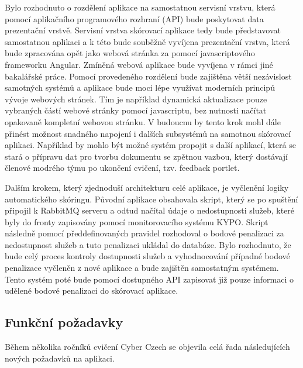 \documentclass[
  digital, %
  twoside, %
  table,   %
  lof,     %
  lot,     %
]{fithesis3}
\begin{document}
Bylo rozhodnuto o rozdělení aplikace na samostatnou servisní vrstvu, která pomocí aplikačního programového rozhraní (API) bude poskytovat data prezentační vrstvě. Servisní vrstva skórovací aplikace tedy bude představovat samostatnou aplikaci a k této bude souběžně vyvíjena prezentační vrstva, která bude zpracována opět jako webová stránka za pomocí javascriptového frameworku Angular. Zmíněná webová aplikace bude vyvíjena v rámci jiné bakalářské práce. Pomocí provedeného rozdělení bude zajištěna větší nezávislost samotných systémů a aplikace bude moci lépe využívat moderních principů vývoje webových stránek. Tím je například dynamická aktualizace pouze vybraných částí webové stránky pomocí javascriptu, bez nutnosti načítat opakovaně kompletní webovou stránku. V budoucnu by tento krok mohl dále přinést možnost  snadného napojení i dalších subsystémů na samotnou skórovací aplikaci. Například by mohlo být možné systém propojit s další aplikací, která se stará o přípravu dat pro tvorbu dokumentu se zpětnou vazbou, který dostávají členové modrého týmu po ukončení cvičení, tzv. feedback portlet.

Dalším krokem, který zjednoduší architekturu celé aplikace, je vyčlenění logiky automatického skóringu. Původní aplikace obsahovala skript, který se po spuštění připojil k RabbitMQ serveru a odtud načítal údaje o nedostupnosti služeb, které byly do fronty zapisovány pomocí monitorovacího systému KYPO. Skript následně pomocí předdefinovaných pravidel rozhodoval o bodové penalizaci za nedostupnost služeb a tuto penalizaci ukládal do databáze. Bylo rozhodnuto, že bude celý proces kontroly dostupnosti služeb a vyhodnocování případné bodové penalizace vyčleněn z nové aplikace a bude zajištěn samostatným systémem. Tento systém poté bude pomocí dostupného API zapisovat již pouze informaci o udělené bodové penalizaci do skórovací aplikace.

\subsection{Funkční požadavky}

Během několika ročníků cvičení Cyber Czech se objevila celá řada následujících nových požadavků na aplikaci.
\end{document}
